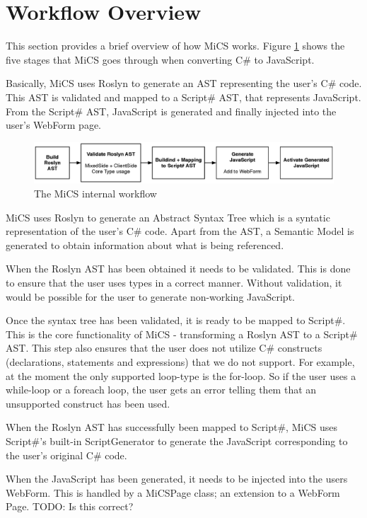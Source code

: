 \section{Workflow Overview} %
\label{sec:workflow_overview}

This section provides a brief overview of how MiCS works. Figure \ref{fig:mics_internal_workflow} shows the five stages that MiCS goes through when converting C\# to JavaScript.

Basically, MiCS uses Roslyn to generate an AST representing the user’s C\# code. This AST is validated and mapped to a Script\# AST, that represents JavaScript. From the Script\# AST, JavaScript is generated and finally injected into the user’s WebForm page.

\begin{figure}[H]
	\begin{center}
		\centerline{\includegraphics[width=18cm]{resources/images/internalworkflow.eps}}
	\end{center}
	\caption{The MiCS internal workflow}
	\label{fig:mics_internal_workflow}
\end{figure}

MiCS uses Roslyn to generate an Abstract Syntax Tree which is a syntatic representation of the user’s C\# code. Apart from the AST, a Semantic Model is generated to obtain information about what is being referenced.

When the Roslyn AST has been obtained it needs to be validated. This is done to ensure that the user uses types in a correct manner. Without validation, it would be possible for the user to generate non-working JavaScript.

Once the syntax tree has been validated, it is ready to be mapped to Script\#. This is the core functionality of MiCS - transforming a Roslyn AST to a Script\# AST. This step also ensures that the user does not utilize C\# constructs (declarations, statements and expressions) that we do not support. For example, at the moment the only supported loop-type is the for-loop. So if the user uses a while-loop or a foreach loop, the user gets an error telling them that an unsupported construct has been used.

When the Roslyn AST has successfully been mapped to Script\#, MiCS uses Script\#’s built-in ScriptGenerator to generate the JavaScript corresponding to the user’s original C\# code. 

When the JavaScript has been generated, it needs to be injected into the users WebForm. This is handled by a MiCSPage class; an extension to a WebForm Page. TODO: Is this correct? 

